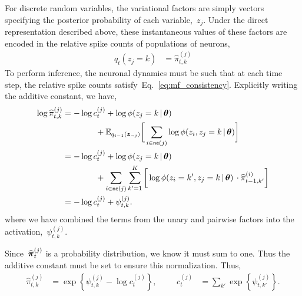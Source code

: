 For discrete random variables, the variational factors are simply
vectors specifying the posterior probability of each variable,~$z_j$.
Under the direct representation described above, these instantaneous
values of these factors are encoded in the relative spike counts of
populations of neurons,
\begin{align}
  q_t(z_j=k) &= \widehat{\pi}_{t,k}^{(j)} 
\end{align}
To perform inference, the neuronal dynamics must be such that at each
time step, the relative spike counts satisfy~Eq.~\ref{eq:mf_consistency}. 
Explicitly writing the additive constant, we have,
\begin{align}
  \nonumber
  \log \widehat{\pi}_{t,k}^{(j)} 
  &= -\log c_t^{(j)} + \log \phi(z_j=k \,|\, \boldsymbol{\theta}) \\
  &\hspace{4em} + \mathbb{E}_{q_{t-1}(\boldsymbol{z}_{\neg j})} \bigg[
  \sum_{i \in \mathsf{ne}(j)} \log \phi(z_{i}, z_j=k \,|\, \boldsymbol{\theta}) \bigg] \\
  & \nonumber = 
     - \log c_t^{(j)} + \log \phi(z_j=k \,|\, \boldsymbol{\theta}) \\
  & \label{eq:variational_rate}
  \hspace{4em} + \sum_{i \in \mathsf{ne}(j)} \sum_{k'=1}^K
  \bigg[\log \phi(z_{i}=k', z_j=k \,|\, \boldsymbol{\theta}) \,\cdot  \widehat{\pi}_{t-1,k'}^{(i)} \bigg] \\
  &= -\log c_t^{(j)} + \psi_{t,k}^{(j)}.
\end{align}
where we have combined the terms from the unary and pairwise factors
into the activation,~$\psi_{t,k}^{(j)}$.

Since~$\widehat{\boldsymbol{\pi}}_{t}^{(j)}$ is a probability distribution, we
know it must sum to one. Thus the additive constant must be set to
ensure this normalization.  Thus,
\begin{align}
  \widehat{\pi}_{t,k}^{(j)} &=
  \exp \left \{\psi_{t,k}^{(j)} -\log c_{t}^{(j)} \right \},
  & & &
  c_t^{(j)} &= \sum_{k'} \exp \left \{\psi_{t,k'}^{(j)} \right \}.
\end{align}


